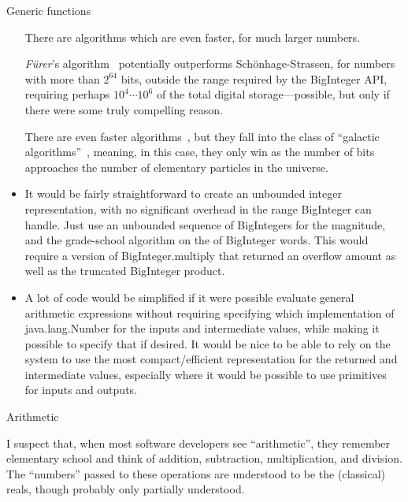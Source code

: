 \documentclass[12pt]{PalisadesLakesBook}
\begin{document}
\begin{plSection}{Generic functions}
\begin{itemize}
There are algorithms which are even faster,
for much larger numbers.

\textit{F\"{u}rer}'s algorithm~\cite{ wiki:FurerMultiplication}
potentially outperforms Sch\"{o}nhage-Strassen,
for numbers with more than $2^{64}$ bits, 
outside the range required by the {\javaFont BigInteger} 
API, requiring perhaps $10^{4} \cdots 10^{6}$ 
of the total digital storage---possible, but only if there were
some truly compelling reason.

There are even faster algorithms~\cite{
Hartnett:2019:NLogNIntegerMultiplication,
HarveyVanDerHoeven:2020:NLogNIntegerMultiplication},
but they fall into the class of 
``galactic algorithms''~\cite{wiki:GalacticAlgorithm},
meaning, in this case, they only win as the number of bits
approaches the number of elementary particles in the universe.

\item It would be fairly straightforward to create an unbounded
integer representation, with no significant overhead 
in the range {\javaFont BigInteger}
can handle.
Just use an unbounded sequence of {\javaFont BigInteger}s
for the magnitude, and the grade-school algorithm on the
of {\javaFont BigInteger} words.
This would require a version of {\javaFont BigInteger.multiply}
that returned an overflow amount as well as the truncated
{\javaFont BigInteger} product. 

\item A lot of code would be simplified if it were possible
evaluate general arithmetic expressions without requiring 
specifying which implementation of {\javaFont java.lang.Number}
for the inputs and intermediate values,
while making it possible to specify that if desired.
It would be nice to be able to rely on the system 
to use the most compact/efficient representation for the returned
and intermediate values, especially where it would be possible to
use primitives for inputs and outputs.
\end{itemize}

\end{plSection}%
\begin{plSection}{Arithmetic} 

I suspect that, when most software developers see ``arithmetic'',
they remember elementary school
and think of addition, subtraction, multiplication, and division.
The ``numbers'' passed to these operations are 
understood to be the (classical) reals, 
though probably only partially understood.


\end{plSection}%
\end{document}
